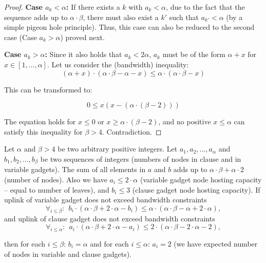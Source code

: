 \documentclass[conference,10pt]{IEEEtran}
\newcommand{\maciek}[1]{\textcolor{brown}{maciek: #1}}
\newcommand{\clauses}{\alpha}
\newcommand{\variables}{\beta}
\begin{document}
\begin{appendix}
\begin{proof}
\textbf{Case $a_k<\clauses$:} If there exists a $k$ with $a_k<\clauses$,
due to the fact that the sequence adds up to $\clauses \cdot \variables$,
there must also exist a $k'$ such that $a_{k'}<\clauses$ (by a simple
pigeon hole principle). Thus, this case can
also be reduced to the second case (Case $a_k>\clauses$) proved
next.

\textbf{Case $a_k>\clauses$:} Since it also holds that $a_k < 2\clauses$,
$a_k$ must be of the form $\clauses + x$ for $x \in [1, \ldots, \clauses]$.
Let us consider the (bandwidth) inequality:
$$ (\clauses + x) \cdot (\clauses \cdot \variables - \clauses - x) \leq \clauses \cdot (\clauses \cdot \variables - x) $$

This can be transformed to:

$$ 0 \leq x(x - (\clauses \cdot (\variables - 2))) $$

The equation holds for $x \leq 0$ or $x \geq \clauses \cdot (\variables - 2)$,
and no
positive $x \leq \clauses$ can satisfy this inequality for $\variables > 4$. Contradiction.
\end{proof}
\begin{lemma}\label{lem:bandwidth-lemma-extended}
  Let $\clauses$ and $\variables > 4$ be two arbitrary positive integers. Let $a_1, a_2, \ldots,
  a_{\clauses}$ and $b_1, b_2, \ldots,
  b_{\variables}$ be two sequences of integers (numbers of nodes in clause and 
in variable gadgets). The sum of all elements in $a$ and $b$ adds up to
  $\clauses \cdot \variables + \clauses \cdot 2$ (number of nodes). Also
  we have $a_i \leq 2 \cdot \clauses$
  (variable gadget node hosting capacity -- equal to number of leaves),
  and $b_i \leq 3$ (clause gadget node hosting capacity). If uplink of variable 
gadget does not exceed bandwidth constraints
  $$ \forall_{i\leq\variables}:~~ b_i \cdot (\clauses \cdot \variables
  + 2\cdot \clauses- b_i) \leq \clauses \cdot (\clauses \cdot \variables -
  \clauses + 2 \cdot \clauses), $$
and uplink of clause gadget does not exceed bandwidth constraints
$$ \forall_{i\leq\clauses}:~~ a_i \cdot (\clauses \cdot \variables + 2 \cdot \clauses - a_i) \leq 2 \cdot (\clauses \cdot \variables -
  2 \cdot \clauses - 2), $$

\noindent  then for each $i\leq \variables$: $b_i = \clauses$ and for
each $i\leq\clauses$: $a_i = 2$ (we have expected number of nodes in variable 
and clause gadgets).
\end{lemma}




\end{appendix}
\end{document}
